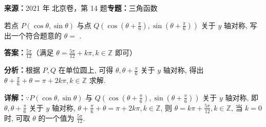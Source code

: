 \begin{question}[points=5]
\textbf{来源：}2021 年 北京卷，第 14 题\quad \textbf{专题：}三角函数\par
若点 $P(\cos\theta,\sin\theta)$ 与点 $Q(\cos(\theta+\frac{\pi}{6}),\sin(\theta+\frac{\pi}{6}))$ 关于 $y$ 轴对称, 写出一个符合题意的 $\theta=$ .
\fillin[{$\frac{5\pi}{12}$（满足 $\theta=\frac{5\pi}{12}+k\pi, k\in\mathbb{Z}$ 即可）}]
\begin{solution}
\textbf{答案：}$\frac{5\pi}{12}$（满足 $\theta=\frac{5\pi}{12}+k\pi, k\in\mathbb{Z}$ 即可）

\textbf{分析：}根据 $P,Q$ 在单位圆上, 可得 $\theta,\theta+\frac{\pi}{6}$ 关于 $y$ 轴对称, 得出 $\theta+\frac{\pi}{6}+\theta=\pi+2k\pi, k\in\mathbb{Z}$ 求解.

\textbf{详解：}$\because P(\cos\theta,\sin\theta)$ 与 $Q(\cos(\theta+\frac{\pi}{6}),\sin(\theta+\frac{\pi}{6}))$ 关于 $y$ 轴对称, 即 $\theta,\theta+\frac{\pi}{6}$ 关于 $y$ 轴对称, $\theta+\frac{\pi}{6}+\theta=\pi+2k\pi, k\in\mathbb{Z}$, 则 $\theta=k\pi+\frac{5\pi}{12}, k\in\mathbb{Z}$, 当 $k=0$ 时, 可取 $\theta$ 的一个值为 $\frac{5\pi}{12}$.
\end{solution}
\end{question}

